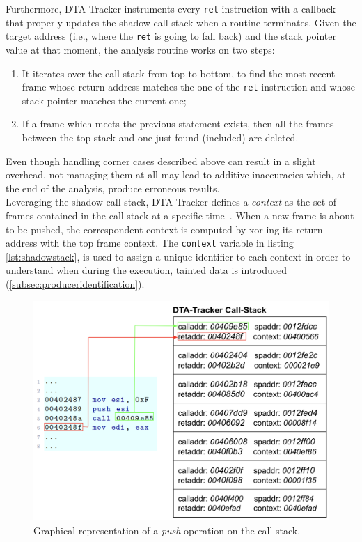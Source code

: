 \documentclass[LaM,binding=0.6cm]{sapthesis}
\begin{document}
Furthermore, {\sf DTA-Tracker} instruments every \texttt{ret} instruction with a callback that properly updates the shadow call stack when a routine terminates. Given the target address (i.e., where the \texttt{ret} is going to fall back) and the stack pointer value at that moment, the analysis routine works on two steps:
\begin{enumerate}
\item It iterates over the call stack from top to bottom, to find the most recent frame whose return address matches the one of the \texttt{ret} instruction and whose stack pointer matches the current one;
\item If a frame which meets the previous statement exists, then all the frames between the top stack and one just found (included) are deleted. 
\end{enumerate}
Even though handling corner cases described above can result in a slight overhead, not managing them at all may lead to additive inaccuracies which, at the end of the analysis, produce erroneous results.\\

Leveraging the shadow call stack, {\sf DTA-Tracker} defines a \textit{context} as the set of frames contained in the call stack at a specific time~\cite{hcct}. When a new frame is about to be pushed, the correspondent context is computed by xor-ing its return address with the top frame context. The \texttt{context} variable in listing \ref{lst:shadowstack}, is used to assign a unique identifier to each context in order to understand when during the execution, tainted data is introduced (\autoref{subsec:produceridentification}).

\begin{figure}[h!]
\centering
\includegraphics[scale=.5]{images/dtatracker2}
\caption{Graphical representation of a \textit{push} operation on the call stack.}
\end{figure}
\newpage
\end{document}
